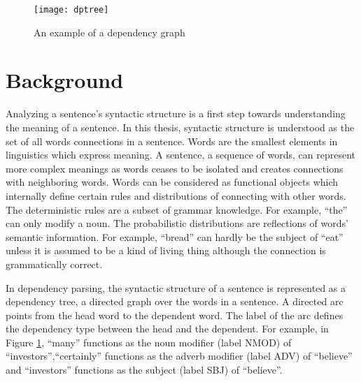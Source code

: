 \begin{figure}
  \centering
    \texttt{[image: dptree]}
  \caption{An example of a dependency graph}
  \label{fig:dptree}
\end{figure}

\section{Background}
\label{sec:Background}
Analyzing a sentence's syntactic structure is a first step towards understanding the meaning of a sentence. In this thesis, syntactic structure is understood as the set of all words connections in a sentence. Words are the  smallest elements in linguistics which express meaning. A sentence, a sequence of words, can represent more complex meanings as words ceases to be isolated and creates connections with neighboring words. Words can be considered as functional objects which internally define certain rules and distributions of connecting with other words. The deterministic rules are a subset of grammar knowledge. For example, ``the'' can only modify a noun. The probabilistic distributions are reflections of words' semantic information. For example, ``bread'' can hardly be the subject of ``eat'' unless it is assumed to be a kind of living thing although the connection is grammatically correct. 

In dependency parsing, the syntactic structure of a sentence is represented as a dependency tree, a directed graph over the words in a sentence. A directed arc points from the head word to the dependent word. The label of the arc defines the dependency type between the head and the dependent. For example, in Figure \ref{fig:dptree}, ``many'' functions as the noun modifier (label NMOD) of ``investors'',``certainly'' functions as the adverb modifier (label ADV) of ``believe'' and ``investors'' functions as the subject (label SBJ) of ``believe''. 




